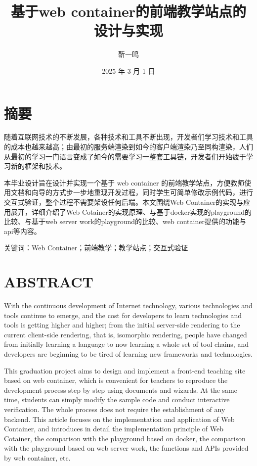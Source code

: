 \documentclass{HDU-Bachelor-Thesis}
\title{基于web container的前端教学站点的设计与实现}
\author{靳一鸣}
\date{2025 年 3 月 1 日}
\begin{document}
\pagestyle{empty}

\maketitle
%

\clearpage
\pagestyle{HDU-bachelor-empty}

\section*{摘\hspace{2em}要}

随着互联网技术的不断发展，各种技术和工具不断出现，开发者们学习技术和工具的成本也越来越高；由最初的服务端渲染到如今的客户端渲染乃至同构渲染，人们从最初的学习一门语言变成了如今的需要学习一整套工具链，开发者们开始疲于学习新的框架和技术。

本毕业设计旨在设计并实现一个基于 web container 的前端教学站点，方便教师使用文档和向导的方式步一步地重现开发过程，同时学生可简单修改示例代码，进行交互式验证，整个过程不需要架设任何后端。本文围绕Web Container的实现与应用展开，详细介绍了Web Cotainer的实现原理、与基于docker实现的playground的比较、与基于web server work的playground的比较、web container提供的功能与api等内容。

\vspace{\baselineskip}\noindent
\textsf{关键词：}Web Container；前端教学；教学站点；交互式验证

\clearpage
\section*{\textbf{ABSTRACT}}

With the continuous development of Internet technology, various technologies and tools continue to emerge, and the cost for developers to learn technologies and tools is getting higher and higher; from the initial server-side rendering to the current client-side rendering, that is, isomorphic rendering, people have changed from initially learning a language to now learning a whole set of tool chains, and developers are beginning to be tired of learning new frameworks and technologies.

This graduation project aims to design and implement a front-end teaching site based on web container, which is convenient for teachers to reproduce the development process step by step using documents and wizards. At the same time, students can simply modify the sample code and conduct interactive verification. The whole process does not require the establishment of any backend. This article focuses on the implementation and application of Web Container, and introduces in detail the implementation principle of Web Cotainer, the comparison with the playground based on docker, the comparison with the playground based on web server work, the functions and APIs provided by web container, etc.
\end{document}

